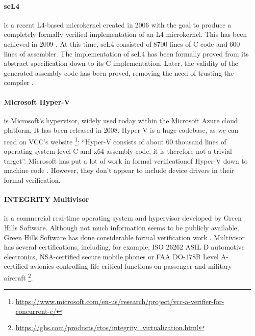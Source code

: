 \documentclass[10pt,a4paper]{article}
\begin{document}
\begin{multicols}{2}
\paragraph{seL4} is a recent L4-based microkernel created in 2006 with the goal to produce a completely formally verified implementation of an L4 microkernel. This has been achieved in 2009 \cite{klein_sel4:_2009}. At this time, seL4 consisted of \num{8700} lines of C code and \num{600} lines of assembler. The implementation of seL4 has been formally proved from its abstract specification down to its C implementation. Later, the validity of the generated assembly code has been proved, removing the need of trusting the compiler \cite{noauthor_what_nodate}.

\paragraph{Microsoft Hyper-V} is Microsoft's hypervisor, widely used today within the Microsoft Azure cloud platform. It has been released in 2008. Hyper-V is a huge codebase, as we can read on VCC's website \footnote{\url{https://www.microsoft.com/en-us/research/project/vcc-a-verifier-for-concurrent-c/}}: ``Hyper-V consists of about 60 thousand lines of operating system-level C and x64 assembly code, it is therefore not a trivial target''. Microsoft has put a lot of work in formal verification\footnotemark of Hyper-V down to machine code \cite{leinenbach_verifying_2009}. However, they don't appear to include device drivers in their formal verification.


\paragraph{INTEGRITY Multivisor} is a commercial real-time operating system and hypervisor developed by Green Hills Software. Although not much information seems to be publicly available, Green Hills Software has done considerable formal verification work \cite{richards_modeling_2010}. Multivisor has several certifications, including, for example, ISO 26262 ASIL D automotive electronics, NSA-certified secure mobile phones or FAA DO-178B Level A-certified avionics controlling life-critical functions on passenger and military aircraft \footnote{\url{https://ghs.com/products/rtos/integrity_virtualization.html}}.


\end{multicols}
\end{document}
